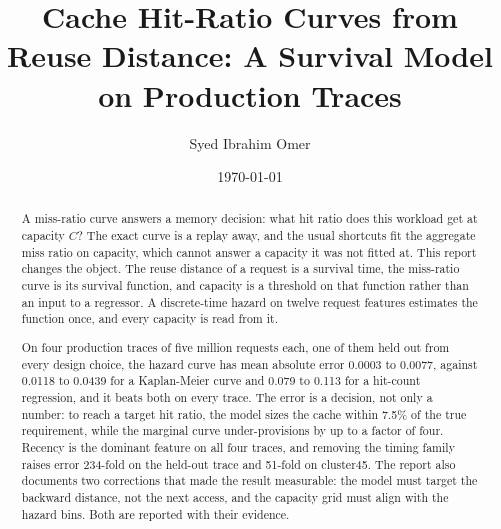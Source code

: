 \documentclass[10pt,a4paper]{article}
\theoremstyle{remark}
\begin{document}
\title{Cache Hit-Ratio Curves from Reuse Distance: A Survival Model on Production Traces}
\author{Syed Ibrahim Omer}
\date{\today}
\maketitle


\begin{abstract}
\noindent
A miss-ratio curve answers a memory decision: what hit ratio does this workload get
at capacity $C$? The exact curve is a replay away, and the usual shortcuts fit the
aggregate miss ratio on capacity, which cannot answer a capacity it was not fitted
at. This report changes the object. The reuse distance of a request is a survival
time, the miss-ratio curve is its survival function, and capacity is a threshold on
that function rather than an input to a regressor. A discrete-time hazard on twelve
request features estimates the function once, and every capacity is read from it.

On four production traces of five million requests each, one of them held out from
every design choice, the hazard curve has mean absolute error 0.0003 to 0.0077,
against 0.0118 to 0.0439 for a Kaplan-Meier curve and 0.079 to 0.113 for a hit-count
regression, and it beats both on every trace. The
error is a decision, not only a number: to reach a target hit ratio, the model sizes
the cache within 7.5\% of the true requirement, while the marginal curve
under-provisions by up to a factor of four. Recency is the dominant feature on all
four traces, and removing the timing family raises error 234-fold on the held-out
trace and 51-fold on cluster45. The
report also documents two corrections that made the result measurable: the model
must target the backward distance, not the next access, and the capacity grid must
align with the hazard bins. Both are reported with their evidence.
\end{abstract}


\clearpage







\end{document}
